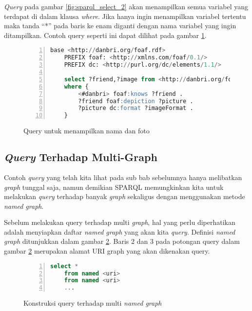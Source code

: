 \emph{Query} pada gambar \ref{fig:sparql_select_2} akan menampilkan semua variabel yang terdapat di dalam klausa \emph{where}. Jika hanya ingin menampilkan variabel tertentu maka tanda ``*'' pada baris ke enam diganti dengan nama variabel yang ingin ditampilkan. Contoh query seperti ini dapat dilihat pada gambar \ref{fig:sparql_select_3}.

\begin{figure}[hb]
	\centering
	\begin{lstlisting}[language=SQL,numbers=left]
	base <http://danbri.org/foaf.rdf>
	PREFIX foaf: <http://xmlns.com/foaf/0.1/>
	PREFIX dc: <http://purl.org/dc/elements/1.1/>

	select ?friend,?image from <http://danbri.org/foaf.rdf>
	where {
		<#danbri> foaf:knows ?friend .
		?friend foaf:depiction ?picture .
		?picture dc:format ?imageFormat .
	}\end{lstlisting}
	\caption{Query untuk menampilkan nama dan foto}
	\label{fig:sparql_select_3}
\end{figure}

\subsection{\emph{Query} Terhadap Multi-Graph}
Contoh \emph{query} yang telah kita lihat pada sub bab sebelumnya hanya melibatkan \emph{graph} tunggal saja, namun demikian SPARQL memungkinkan kita untuk melakukan \emph{query} terhadap banyak \emph{graph} sekaligus dengan menggunakan metode \emph{named graph}.

Sebelum melakukan query terhadap multi \emph{graph}, hal yang perlu diperhatikan adalah menyiapkan daftar \emph{named graph} yang akan kita \emph{query}. Definisi \emph{named graph} ditunjukkan dalam gambar \ref{fig:definisi_named_graph}. Baris 2 dan 3 pada potongan query dalam gambar \ref{fig:definisi_named_graph} merupakan alamat URI graph yang akan dikenakan query.

\begin{figure}[ht]
	\centering
	\begin{lstlisting}[language=SQL, numbers=left]
	select *
	from named <uri>
	from named <uri>
	...\end{lstlisting}
	\caption{Konstruksi query terhadap multi \emph{named graph} \citep{liyang_yu}}
	\label{fig:definisi_named_graph}
\end{figure}